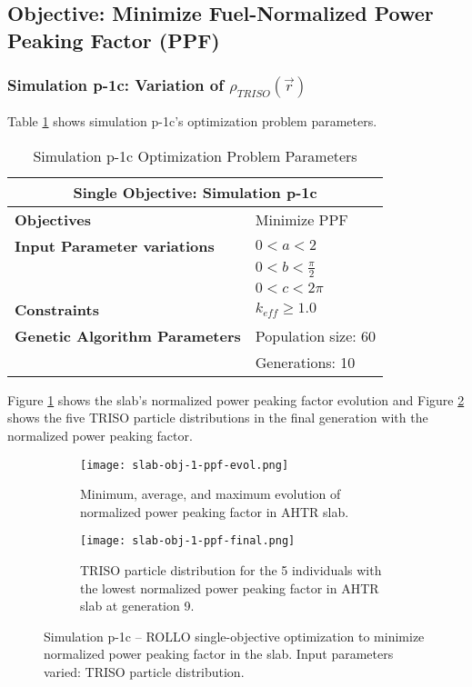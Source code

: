 \subsection{Objective: Minimize Fuel-Normalized Power Peaking Factor (PPF)}

\subsubsection{Simulation p-1c: Variation of $\rho_{TRISO}(\vec{r})$}
Table \ref{tab:simulationp1c} shows simulation p-1c's optimization problem parameters. 
\begin{table}[htbp]
    \centering
    \onehalfspacing
    \caption{Simulation p-1c Optimization Problem Parameters}
	\label{tab:simulationp1c}
    \footnotesize
    \begin{tabular}{l|p{3cm}}
    \hline 
    \multicolumn{2}{c}{\textbf{Single Objective: Simulation p-1c}} \\
    \hline 
    \textbf{Objectives} & Minimize PPF \\
    \hline 
    \textbf{Input Parameter variations} & $0<a<2$ \\
    & $0<b<\frac{\pi}{2}$ \\
    & $0<c<2\pi$ \\
    \hline
    \textbf{Constraints} & $k_{eff} \geq 1.0$\\ 
    \hline 
    \textbf{Genetic Algorithm Parameters} & Population size: 60 \\
    & Generations: 10 \\
    \hline
    \end{tabular}
\end{table}
Figure \ref{fig:slab-obj-1-ppf-evol} shows the slab's normalized power peaking 
factor evolution and Figure \ref{fig:slab-obj-1-ppf-final} shows the five TRISO particle 
distributions in the final generation with the normalized power peaking factor.
\begin{figure}[htbp]
    \centering
    \begin{subfigure}{\textwidth}
        \texttt{[image: slab-obj-1-ppf-evol.png]}
        \caption{Minimum, average, and maximum evolution of normalized power 
        peaking factor in AHTR slab.}
        \label{fig:slab-obj-1-ppf-evol} 
    \end{subfigure}
    \begin{subfigure}{\textwidth}
        \texttt{[image: slab-obj-1-ppf-final.png]}
        \caption{TRISO particle distribution for the 5 individuals with the 
        lowest normalized power peaking factor in AHTR slab at generation 9.}
        \label{fig:slab-obj-1-ppf-final} 
    \end{subfigure}
    \caption{Simulation p-1c -- ROLLO single-objective optimization to minimize normalized power 
    peaking factor in the slab. Input parameters varied: TRISO particle distribution.}
    \label{fig:slab-obj-1-ppf}
\end{figure}
